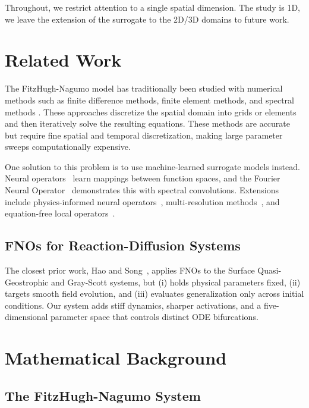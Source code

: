\documentclass[runningheads]{llncs}
\begin{document}
Throughout, we restrict attention to a single spatial dimension. The study is 1D, we leave the extension of the surrogate to the 2D/3D domains to future work.

\section{Related Work}

The FitzHugh-Nagumo model has traditionally been studied with numerical methods such as finite difference methods, finite element methods, and spectral methods \cite{Quarteroni2000,LeVeque2007}. These approaches discretize the spatial domain into grids or elements and then iteratively solve the resulting equations. These methods are accurate but require fine spatial and temporal discretization, making large parameter sweeps computationally expensive.

%
One solution to this problem is to use machine-learned surrogate models instead.  Neural operators~\cite{kovachki2021neural} learn mappings between function spaces, and the Fourier Neural Operator~\cite{li2021fourierneuraloperatorparametric} demonstrates this with spectral convolutions. Extensions include physics-informed neural operators~\cite{li2023physicsinformedneuraloperatorlearning}, multi-resolution methods~\cite{liu2024multi}, and equation-free local operators~\cite{fabiani2025enabling}.

%
\subsection{FNOs for Reaction-Diffusion Systems}

The closest prior work, Hao and Song~\cite{hao2024fourier}, applies FNOs to the Surface Quasi-Geostrophic and Gray-Scott systems, but (i) holds physical parameters fixed, (ii) targets smooth field evolution, and (iii) evaluates generalization only across initial conditions. Our system adds stiff dynamics, sharper activations, and a five-dimensional parameter space that controls distinct ODE bifurcations.

\section{Mathematical Background}
\subsection{The FitzHugh-Nagumo System}
\end{document}
